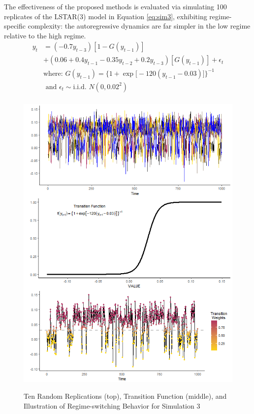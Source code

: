 The effectiveness of the proposed methods is evaluated via simulating 100 replicates of the LSTAR(3) model in Equation \ref{eq:sim3}, exhibiting regime-specific complexity: the autoregressive dynamics are far simpler in the low regime relative to the high regime.
 \begin{equation}
	\begin{split}
		\label{eq:sim3}
		y_t&=(-0.7y_{t-3})[1-G(y_{t-1})] \\
		& +(0.06+0.4y_{t-1}-0.35y_{t-2}+0.2y_{t-3})[G(y_{t-1})]+\epsilon_t\\
		& \textrm{where: } G(y_{t-1})=\bigg\{1+\exp\big[-120(y_{t-1}-0.03)\big]\bigg\}^{-1} \\
		&\textrm{ and }\epsilon_t \sim \textrm{i.i.d. }  N (0,0.02^2)\\
	\end{split}
\end{equation}
\begin{figure}
	\centering
	\caption{Ten Random Replications (top), Transition Function (middle), and Illustration of Regime-switching Behavior  for Simulation 3}
	\includegraphics[scale=.7]{sim3plots}
	\label{fig:sim3plots}
\end{figure}
